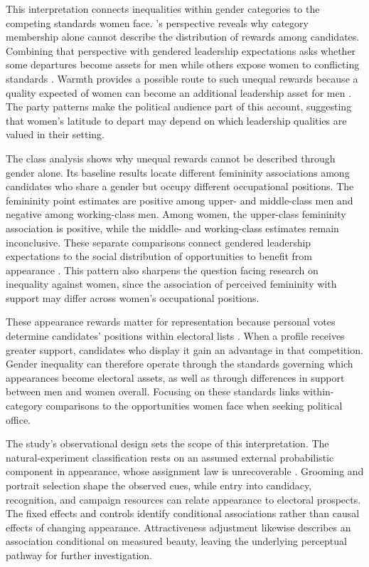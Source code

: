 \documentclass[11pt,a4paper]{article}\usepackage[]{graphicx}\usepackage[]{xcolor}
\begin{document}
This interpretation connects inequalities within gender categories to the competing standards women face. \textcite{Monk2022}'s perspective reveals why category membership alone cannot describe the distribution of rewards among candidates. Combining that perspective with gendered leadership expectations asks whether some departures become assets for men while others expose women to conflicting standards \parencite{Eagly2002,RudmanGlick2001}. Warmth provides a possible route to such unequal rewards because a quality expected of women can become an additional leadership asset for men \parencite{CarpinellaJohnson2013b,Hentschel2018}. The party patterns make the political audience part of this account, suggesting that women's latitude to depart may depend on which leadership qualities are valued in their setting.

The class analysis shows why unequal rewards cannot be described through gender alone. Its baseline results locate different femininity associations among candidates who share a gender but occupy different occupational positions. The femininity point estimates are positive among upper- and middle-class men and negative among working-class men. Among women, the upper-class femininity association is positive, while the middle- and working-class estimates remain inconclusive. These separate comparisons connect gendered leadership expectations to the social distribution of opportunities to benefit from appearance \parencite{Monk2022,Bahamonde2024}. This pattern also sharpens the question facing research on inequality against women, since the association of perceived femininity with support may differ across women's occupational positions.

These appearance rewards matter for representation because personal votes determine candidates' positions within electoral lists \parencite{HolliWass2010,SoderlundVonSchoultz2024}. When a profile receives greater support, candidates who display it gain an advantage in that competition. Gender inequality can therefore operate through the standards governing which appearances become electoral assets, as well as through differences in support between men and women overall. Focusing on these standards links within-category comparisons to the opportunities women face when seeking political office.

The study's observational design sets the scope of this interpretation. The natural-experiment classification rests on an assumed external probabilistic component in appearance, whose assignment law is unrecoverable \parencite[118--119]{Titiunik2021}. Grooming and portrait selection shape the observed cues, while entry into candidacy, recognition, and campaign resources can relate appearance to electoral prospects. The fixed effects and controls identify conditional associations rather than causal effects of changing appearance. Attractiveness adjustment likewise describes an association conditional on measured beauty, leaving the underlying perceptual pathway for further investigation.
\end{document}
